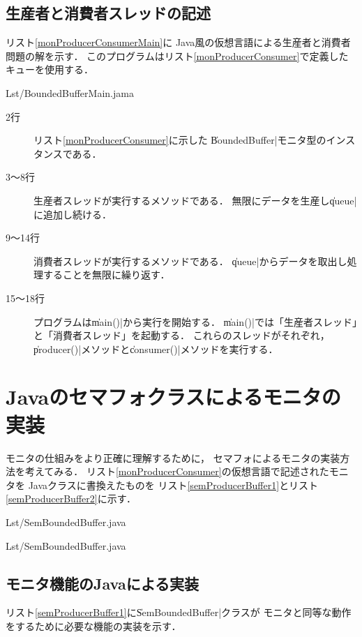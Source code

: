 \subsection{生産者と消費者スレッドの記述}
リスト\ref{monProducerConsumerMain}に
Java風の仮想言語による生産者と消費者問題の解を示す．
このプログラムはリスト\ref{monProducerConsumer}で定義したキューを使用する．


                {Lst/BoundedBufferMain.jama}

\begin{description}
\item [2行] 
  リスト\ref{monProducerConsumer}に示した
  \|BoundedBuffer|モニタ型のインスタンスである．
\item [3〜8行]
  生産者スレッドが実行するメソッドである．
  無限にデータを生産し\|queue|に追加し続ける．
\item [9〜14行]
  消費者スレッドが実行するメソッドである．
  \|queue|からデータを取出し処理することを無限に繰り返す．
\item [15〜18行]
  プログラムは\|main()|から実行を開始する．
  \|main()|では「生産者スレッド」と「消費者スレッド」を起動する．
  これらのスレッドがそれぞれ，
  \|producer()|メソッドと\|consumer()|メソッドを実行する．
\end{description}

\section{Javaのセマフォクラスによるモニタの実装}
モニタの仕組みをより正確に理解するために，
セマフォによるモニタの実装方法を考えてみる．
リスト\ref{monProducerConsumer}の仮想言語で記述されたモニタを
Javaクラスに書換えたものを
リスト\ref{semProducerBuffer1}とリスト\ref{semProducerBuffer2}に示す．


                {Lst/SemBoundedBuffer.java}


                {Lst/SemBoundedBuffer.java}

\subsection{モニタ機能のJavaによる実装}
リスト\ref{semProducerBuffer1}に\|SemBoundedBuffer|クラスが
モニタと同等な動作をするために必要な機能の実装を示す．

